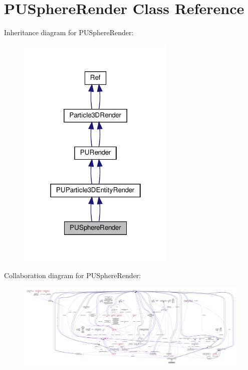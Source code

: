 \hypertarget{classPUSphereRender}{}\section{P\+U\+Sphere\+Render Class Reference}
\label{classPUSphereRender}


Inheritance diagram for P\+U\+Sphere\+Render\+:
\nopagebreak
\begin{figure}[H]
\begin{center}
\leavevmode
\includegraphics[width=214pt]{classPUSphereRender__inherit__graph}
\end{center}
\end{figure}


Collaboration diagram for P\+U\+Sphere\+Render\+:
\nopagebreak
\begin{figure}[H]
\begin{center}
\leavevmode
\includegraphics[width=350pt]{classPUSphereRender__coll__graph}
\end{center}
\end{figure}

